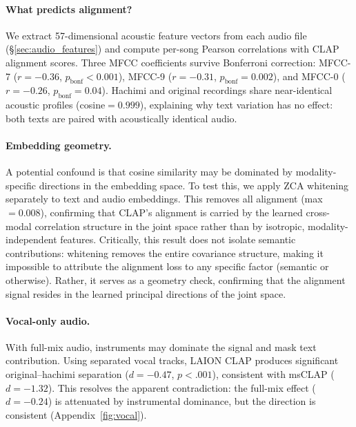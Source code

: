 \documentclass[11pt]{article}
\begin{document}
\paragraph{What predicts alignment?}
We extract 57-dimensional acoustic feature vectors from each audio file (\S\ref{sec:audio_features}) and compute per-song Pearson correlations with CLAP alignment scores. Three MFCC coefficients survive Bonferroni correction: MFCC-7 ($r{=}{-}0.36$, $p_{\text{bonf}}{<}0.001$), MFCC-9 ($r{=}{-}0.31$, $p_{\text{bonf}}{=}0.002$), and MFCC-0 ($r{=}{-}0.26$, $p_{\text{bonf}}{=}0.04$). Hachimi and original recordings share near-identical acoustic profiles (cosine${=}0.999$), explaining why text variation has no effect: both texts are paired with acoustically identical audio.

\paragraph{Embedding geometry.}
A potential confound is that cosine similarity may be dominated by modality-specific directions in the embedding space. To test this, we apply ZCA whitening separately to text and audio embeddings. This removes all alignment (max${=}0.008$), confirming that CLAP's alignment is carried by the learned cross-modal correlation structure in the joint space rather than by isotropic, modality-independent features. Critically, this result does not isolate semantic contributions: whitening removes the entire covariance structure, making it impossible to attribute the alignment loss to any specific factor (semantic or otherwise). Rather, it serves as a geometry check, confirming that the alignment signal resides in the learned principal directions of the joint space.

\paragraph{Vocal-only audio.}
With full-mix audio, instruments may dominate the signal and mask text contribution. Using separated vocal tracks, LAION CLAP produces significant original--hachimi separation ($d{=}{-}0.47$, $p{<}.001$), consistent with msCLAP ($d{=}{-}1.32$). This resolves the apparent contradiction: the full-mix effect ($d{=}{-}0.24$) is attenuated by instrumental dominance, but the direction is consistent (Appendix~\ref{fig:vocal}).
\end{document}
